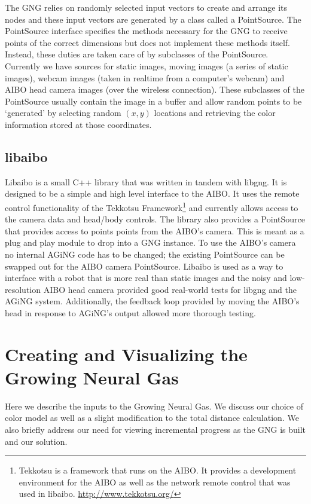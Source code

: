 \documentclass{article}
\renewcommand{\|}{\origbar} %
\begin{document}
The GNG relies on randomly selected input vectors to create and arrange its nodes and these input vectors are generated by a class called a PointSource. The PointSource interface specifies the methods necessary for the GNG to receive points of the correct dimensions but does not implement these methods itself. Instead, these duties are taken care of by subclasses of the PointSource. Currently we have sources for static images, moving images (a series of static images), webcam images (taken in realtime from a computer's webcam) and AIBO head camera images (over the wireless connection). These subclasses of the PointSource usually contain the image in a buffer and allow random points to be `generated' by selecting random $(x,y)$ locations and retrieving the color information stored at those coordinates.

\subsection{libaibo}

Libaibo is a small C++ library that was written in tandem with libgng. It is designed to be a simple and high level interface to the AIBO. It uses the remote control functionality of the Tekkotsu Framework\footnote{Tekkotsu is a framework that runs on the AIBO. It provides a development environment for the AIBO as well as the network remote control that was used in libaibo. \url{http://www.tekkotsu.org/}} and currently allows access to the camera data and head/body controls. The library also provides a PointSource that provides access to points points from the AIBO's camera. This is meant as a plug and play module to drop into a GNG instance. To use the AIBO's camera no internal AGiNG code has to be changed; the existing PointSource can be swapped out for the AIBO camera PointSource. Libaibo is used as a way to interface with a robot that is more real than static images and the noisy and low-resolution AIBO head camera provided good real-world tests for libgng and the AGiNG system. Additionally, the feedback loop provided by moving the AIBO's head in response to AGiNG's output allowed more thorough testing. 

\section{Creating and Visualizing the Growing Neural Gas}
\label{sec:creatingGNG}

Here we describe the inputs to the Growing Neural Gas. We discuss our choice of color model as well as a slight modification to the total distance calculation. We also briefly address our need for viewing incremental progress as the GNG is built and our solution.
\end{document}
